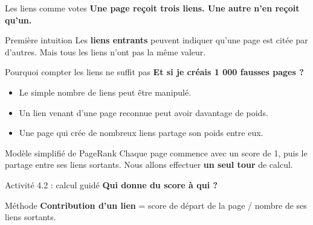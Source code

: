 \documentclass[aspectratio=169,11pt]{beamer}
\newcommand{\question}[1]{{\Large\color{or}\bfseries #1}}
\begin{document}
\begin{frame}{Les liens comme votes}
\question{Une page reçoit trois liens. Une autre n'en reçoit qu'un.}
\vspace{5mm}
\begin{center}
\end{center}
\pause
\begin{block}{Première intuition}
Les \textbf{liens entrants} peuvent indiquer qu'une page est citée par d'autres. Mais tous les liens n'ont pas la même valeur.
\end{block}
\end{frame}

\begin{frame}{Pourquoi compter les liens ne suffit pas}
\question{Et si je créais 1 000 fausses pages ?}
\vspace{5mm}
\begin{itemize}\setlength{\itemsep}{5mm}
\item Le simple nombre de liens peut être manipulé.
\pause
\item Un lien venant d'une page reconnue peut avoir davantage de poids.
\pause
\item Une page qui crée de nombreux liens partage son poids entre eux.
\end{itemize}
\vspace{6mm}
\begin{block}{Modèle simplifié de PageRank}
Chaque page commence avec un score de 1, puis le partage entre ses liens sortants. Nous allons effectuer \textbf{un seul tour} de calcul.
\end{block}
\end{frame}

\begin{frame}{Activité 4.2 : calcul guidé}
\question{Qui donne du score à qui ?}
\vspace{5mm}
\begin{center}
\end{center}
\vspace{7mm}
\pause
\begin{block}{Méthode}
\textbf{Contribution d'un lien} = score de départ de la page / nombre de ses liens sortants.
\end{block}
\vspace{3mm}
\end{frame}
\end{document}

